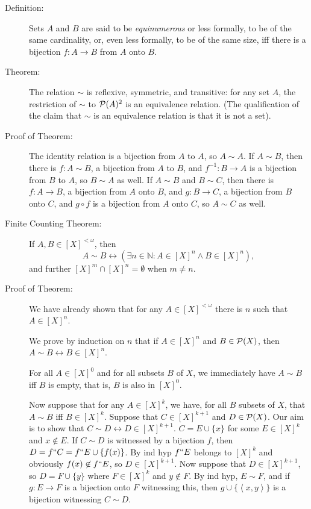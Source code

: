 \documentclass[12pt]{book}
\begin{document}
\begin{description}

\item[Definition:]  Sets $A$ and $B$ are said to be {\em equinumerous\/} or less formally, to be of the same cardinality, or, even less formally, to be of the same size, iff there is a bijection $f:A \rightarrow B$ from $A$ onto $B$.

\item[Theorem:]  The relation $\sim$ is reflexive, symmetric, and transitive:  for any set $A$, the restriction of $\sim$ to ${\cal P}(A)^2$ is an equivalence relation.  (The qualification of the claim that $\sim$ is an equivalence relation is that it is not a set).

\item[Proof of Theorem:]  The identity relation is a bijection from $A$ to $A$, so $A \sim A$.  If $A \sim B$, then there is $f:A \sim B$, a bijection from $A$ to $B$, and $f^{-1}:B \rightarrow A$ is a bijection from $B$ to $A$, so $B \sim A$ as well.  If $A \sim B$ and $B \sim C$, then there is $f:A \rightarrow B$, a bijection from $A$ onto $B$, and $g:B \rightarrow C$, a bijection from $B$ onto $C$, and $g \circ f$ is a bijection from $A$ onto $C$, so $A \sim C$ as well.

\item[Finite Counting Theorem:]  If $A,B \in [X]^{<\omega}$, then $$A \sim B \leftrightarrow (\exists n \in {\mathbb N}:A \in [X]^n \wedge B \in [X]^n),$$ and further $[X]^m \cap [X]^n = \emptyset$ when $m \neq n$.

\item[Proof of Theorem:]  We have already shown that for any $A \in [X]^{<\omega}$ there is $n$ such that $A \in [X]^n$.

We prove by induction on $n$ that if $A \in [X]^n$ and $B \in {\cal P}(X)$, then $A \sim B \leftrightarrow B \in [X]^n$.

For all $A \in [X]^0$ and for all subsets $B$ of $X$, we immediately have $A \sim B$ iff $B$ is empty, that is, $B$ is also in $[X]^0$.

Now suppose that for any $A \in [X]^k$, we have, for all $B$ subsets of $X$, that $A \sim B$ iff $B \in [X]^k$.    Suppose that $C \in [X]^{k+1}$ and $D \in {\cal P}(X)$.  Our aim is to show that $C \sim D \leftrightarrow D \in [X]^{k+1}$.  $C = E \cup \{x\}$ for some $E \in [X]^k$ and $x \not\in E$.  If $C \sim D$ is witnessed by a bijection $f$,
then $D = f``C = f``E \cup \{f(x)\}$.  By ind hyp $f``E$ belongs to $[X]^k$ and obviously $f(x) \not\in f``E$, so $D \in [X]^{k+1}$.  Now suppose that $D \in [X]^{k+1}$,
so $D = F \cup \{y\}$ where $F \in [X]^k$ and $y \not\in F$.  By ind hyp, $E \sim F$, and if $g:E \rightarrow F$ is a bijection onto $F$ witnessing this, then $g \cup \{\left<x,y\right>\}$ is a bijection witnessing $C \sim D$.


\end{description}
\end{document}
